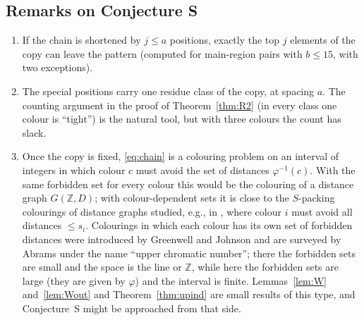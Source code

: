 \documentclass[11pt,a4paper]{article}
\theoremstyle{definition}
\theoremstyle{remark}
\begin{document}
\subsection{Remarks on Conjecture S}
\begin{enumerate}[label=(\roman*)]
\item If the chain is shortened by $j\le a$ positions, exactly the top $j$ elements of the copy can leave the pattern (computed for main-region pairs with $b\le15$, with two exceptions).
\item The special positions carry one residue class of the copy, at spacing $a$. The counting argument in the proof of Theorem~\ref{thm:R2} (in every class one colour is ``tight'') is the natural tool, but with three colours the count has slack.
\item Once the copy is fixed, \eqref{eq:chain} is a colouring problem on an interval of integers in which colour $c$ must avoid the set of distances $\varphi^{-1}(c)$. With the same forbidden set for every colour this would be the colouring of a distance graph $G(\mathbb Z,D)$; with colour-dependent sets it is close to the $S$-packing colourings of distance graphs studied, e.g., in \cite{BFK20}, where colour $i$ must avoid all distances $\le s_i$. Colourings in which each colour has its own set of forbidden distances were introduced by Greenwell and Johnson \cite{GJ92} and are surveyed by Abrams \cite{Abr00} under the name ``upper chromatic number''; there the forbidden sets are small and the space is the line or $\mathbb Z$, while here the forbidden sets are large (they are given by $\varphi$) and the interval is finite. Lemmas~\ref{lem:W} and~\ref{lem:Wout} and Theorem~\ref{thm:upind} are small results of this type, and Conjecture~S might be approached from that side.
\end{enumerate}

\clearpage
\end{document}
